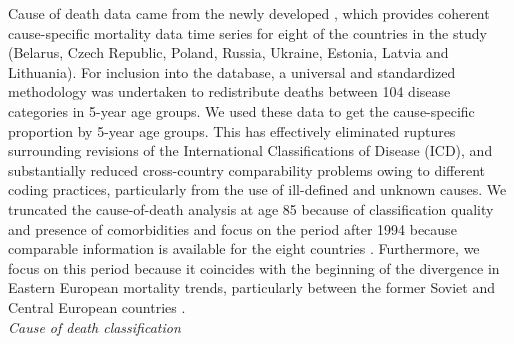 \documentclass{article}
\begin{document}
\begin{spacing}{1.5}
Cause of death data came from the newly developed \citet{HcO}, which provides coherent cause-specific mortality data time series for eight of the countries in the study (Belarus, Czech Republic, Poland, Russia, Ukraine, Estonia, Latvia and Lithuania). For inclusion into the database, a universal and standardized methodology was undertaken to redistribute deaths between 104 disease categories in 5-year age groups. We used these data to get the cause-specific proportion by 5-year age groups. This has effectively eliminated ruptures surrounding revisions of the International Classifications of Disease (ICD), and substantially reduced cross-country comparability problems owing to different coding practices, particularly from the use of ill-defined and unknown causes. We truncated the cause-of-death analysis at age 85 because of classification quality and presence of comorbidities and focus on the period after 1994 because comparable information is available for the eight countries \citep{HcO}. Furthermore, we focus on this period because it coincides with the beginning of the divergence in Eastern European mortality trends, particularly between the former Soviet and Central European countries \citep{mesle2004mortality}.\\

\emph{Cause of death classification}\\


\end{spacing}
\end{document}
